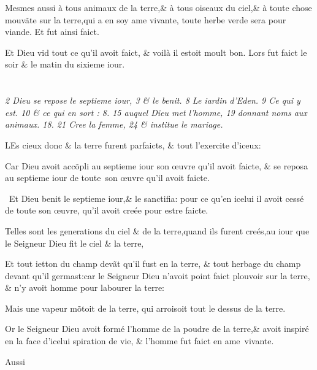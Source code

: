 \documentclass[twocolumn,paper=a4,pagesize=pdftex,12pt,headinclude=on]{scrbook}
\newenvironment{chaptercomment}
  {%
    \setlength{\leftskip}{1em}
    \setlength{\rightskip}{1em}
    \begin{spacing}{0.8}
      \itshape\tiny\hspace{-2em}}
  {%
    \end{spacing}
    \setlength{\leftskip}{0pt}
    \setlength{\rightskip}{0pt}
  }
\newcounter{verse}
\newcommand{\bverse}{%
  \addtocounter{verse}{1}
  \theverse\quad
}
\newcommand{\bversenonum}{%
   \addtocounter{verse}{1}
   \par
}
\newcommand{\bchapter}[1][chap.]{%
   \setcounter{verse}{0}%
   \def\chaptertitle{#1}
   \section{}{}
   \setcounter{footnotemain}{0}
}
\let\lb\linebreak
\begin{document}
\bverse Mesmes aussi à tous animaux de la
terre,\& à tous oiseaux du ciel,\& à tou\-te
chose mouv\~ate sur la terre,qui a en
soy ame vivante, toute herbe verde se\-ra
pour viande. Et fut ainsi faict.

\bverse \footnotemarkmain{} \footnotemarkverse{}Et Dieu vid
tout ce qu'il avoit faict, \& voilà il estoit moult bon. Lors
fut faict le soir \& le matin du sixieme
iour.


\bchapter
{}
\pagestyle{scrplain}

\begin{chaptercomment}
 \emph{2} Dieu se repose le septieme iour,
 \emph{3} \& le benit.
 \emph{8} Le iardin d'Eden. \lb
 \emph{9} Ce qui y est.
 \emph{10} \& ce qui en sort :
 \emph{8. 15} auquel Dieu \lb
 met l'homme,
 \emph{19} donnant noms aux animaux.
 \emph{18. 21} Cree la \lb
 femme,
 \emph{24} \& institue le mariage.
\end{chaptercomment}

\vspace{\baselineskip}

\bversenonum \lettrine[lines=3,loversize=-0.2,lraise=0.2]{L}{}Es cieux donc \& la terre furent
parfaicts, \& tout l'exercite d'i\-ceux:

\bverse \footnotemarkmain{}Car Dieu avoit acc\~opli au septie\-me
iour son \oe{}uvre qu'il avoit faicte, \lb
\footnotemarkmain{}\& se reposa au septieme iour de tou\-te~son
\oe{}uvre qu'il avoit faicte.

\bverse Et Dieu \footnotemarkmain{}benit le septieme iour,\& le
sanctifia: pour ce qu'en icelui il avoit
cessé de toute son \oe{}uvre, qu'il avoit
creée pour estre faicte.

\bverse Telles sont les generations du ciel
\& de la terre,quand ils furent creés,au
iour que le Seigneur Dieu fit le ciel \&
la terre,

\bverse Et tout ietton du champ dev\~at qu'il
fust en la terre, \& tout herbage du
champ devant qu'il germast:car le Sei\-gneur
Dieu n'avoit point faict \footnotemarkmain{}plou\-voir
sur la terre, \& n'y avoit homme
pour labourer la terre:

\bverse Mais une vapeur m\~otoit de la terre,
qui arroisoit tout le dessus de la terre.

\bverse Or le Seigneur Dieu avoit formé
l'homme \footnotemarkmain{}de la poudre
de la terre,\footnotemarkmain{}\&
avoit inspiré en la face d'icelui spira\-tion
de vie, \& l'homme fut faict en
ame~vivante.

\begin{flushright}
Aussi
\end{flushright}
\end{document}
